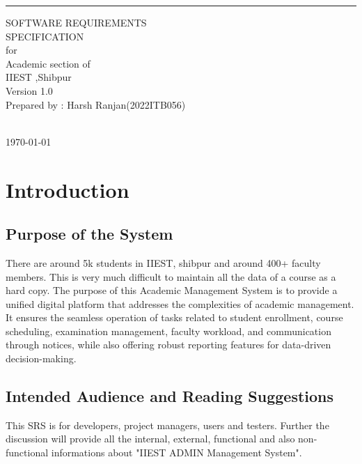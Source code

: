 \documentclass{scrreprt}
\date{}
\def\myversion{1.0 }
\begin{document}
\begin{flushright}
    \rule{16cm}{5pt}\vskip1cm
    \begin{bfseries}
        \Huge{SOFTWARE REQUIREMENTS\\ SPECIFICATION}\\
        \vspace{1.5cm}
        for\\
        \vspace{1.5cm}
        Academic section of \\IIEST ,Shibpur \\
        \vspace{1.5cm}
        \LARGE{Version \myversion}\\
        \vspace{1.5cm}
        Prepared by : Harsh Ranjan(2022ITB056)\\
         \\
        \vspace{1.5cm}
  
        \today\\
    \end{bfseries}
\end{flushright}

\tableofcontents

\chapter{Introduction}

\section{Purpose of the System}
There are around 5k students in IIEST, shibpur and around 400+ faculty members. This is very much difficult to maintain all the data of a course as a hard copy. The purpose of this Academic Management System is to provide a unified digital platform that addresses the complexities of academic management. It ensures the seamless operation of tasks related to student enrollment, course scheduling, examination management, faculty workload, and communication through notices, while also offering robust reporting features for data-driven decision-making.

 

\section{Intended Audience and Reading Suggestions}
This SRS is for developers, project managers, users and testers. Further the discussion will provide all the internal, external, functional and also non-functional informations about "IIEST ADMIN Management System".
\end{document}
